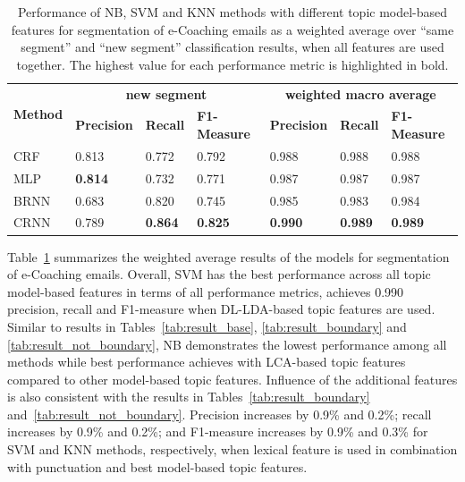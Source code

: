\documentclass{amia}
\begin{document}
\begin{table}[ht]
\centering
\caption{Performance of NB, SVM and KNN methods with different topic model-based features for segmentation of e-Coaching emails as a weighted average over ``same segment'' and ``new segment'' classification results, when all features are used together. The highest value for each performance metric is highlighted in bold.}
\label{tab:result_weighted_avg}
 \begin{tabular}{|l|l|l|l|l|l|l|}
  \hline
   \multirow{2}{*}{\textbf{Method}} & \multicolumn{3}{|c|}{\textbf{new segment}} & \multicolumn{3}{|c|}{\textbf{weighted macro average}} \\\cline{2-7}
   & \textbf{Precision}  & \textbf{Recall} & \textbf{F1-Measure} & \textbf{Precision}  & \textbf{Recall} & \textbf{F1-Measure} \\ \hline    
 CRF & 0.813 & 0.772 & 0.792 & 0.988 & 0.988 & 0.988 \\ \hline
 MLP & \textbf{0.814} & 0.732 & 0.771 & 0.987 & 0.987 & 0.987 \\ \hline
 BRNN & 0.683 & 0.820 & 0.745 & 0.985 & 0.983 & 0.984 \\ \hline
 CRNN & 0.789 & \textbf{0.864} & \textbf{0.825} & \textbf{0.990} & \textbf{0.989} & \textbf{0.989} \\ \hline
  \end{tabular}
\end{table}              

Table~\ref{tab:result_weighted_avg} summarizes the weighted average results of the models for segmentation of e-Coaching emails. Overall, SVM has the best performance across all topic model-based features in terms of all performance metrics, achieves 0.990 precision, recall and F1-measure when DL-LDA-based topic features are used. Similar to results in Tables~\ref{tab:result_base}, \ref{tab:result_boundary} and \ref{tab:result_not_boundary}, NB demonstrates the lowest performance among all methods while best performance achieves with LCA-based topic features compared to other model-based topic features. Influence of the additional features is also consistent with the results in Tables~\ref{tab:result_boundary} and~\ref{tab:result_not_boundary}. Precision increases by 0.9\% and 0.2\%; recall increases by 0.9\% and 0.2\%; and F1-measure increases by 0.9\% and 0.3\% for SVM and KNN methods, respectively, when lexical feature is used in combination with punctuation and best model-based topic features.\\
\end{document}
